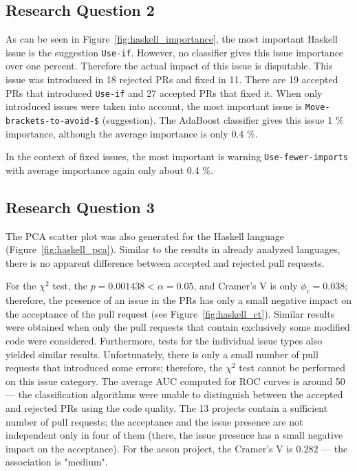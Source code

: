 \documentclass[digital,oneside,oldtable,nolof,nolot,nocover]{fithesis4}
\begin{document}
\subsection{Research Question 2}
\label{sec:org6159aab}
As can be seen in Figure~\ref{fig:haskell_importance},
the most important Haskell issue is the suggestion \texttt{Use-if}.
However, no classifier gives this
issue importance over one percent. Therefore the actual impact of this issue is disputable.
This issue was introduced in 18 rejected PRs and fixed in 11. There are 19 accepted PRs that
introduced \texttt{Use-if} and 27 accepted PRs that fixed it.
When only introduced issues were taken into account, the most important
issue is \texttt{Move-brackets-to-avoid-\$} (suggestion). The AdaBoost classifier
gives this issue 1 \% importance, although the average importance is only 0.4 \%.

In the context of fixed issues, the most important is warning
\texttt{Use-fewer-imports} with average importance again only about 0.4 \%.
\subsection{Research Question 3}
\label{sec:orgeb0969e}
The PCA scatter plot was also generated for the Haskell language (Figure~\ref{fig:haskell_pca}).
Similar to the results in already analyzed languages, there is no apparent
difference between accepted and rejected pull requests.

For the \(\chi^2\) test, the \(p = 0.001438 < \alpha = 0.05\), and Cramer's V is only \(\phi_c = 0.038\);
therefore, the presence of an issue in the PRs has only a small negative impact on the
acceptance of the pull request (see Figure~\ref{fig:haskell_ct}). Similar results were obtained when only
the pull requests that contain exclusively some modified code were considered.
Furthermore, tests for the individual issue types also yielded similar results.
Unfortunately, there is only a small number of pull requests that introduced some errors;
therefore, the \(\chi^2\) test cannot be performed on this issue category.
The average AUC computed for ROC curves is around 50 --- the classification algorithms
were unable to distinguish between the accepted and rejected PRs using the code quality.
The 13 projects contain a sufficient number of pull requests; the acceptance and
the issue presence are not independent only in four of them (there, the issue presence
has a small negative impact on the acceptance). For the aeson project,
the Cramer's V is \(0.282\) --- the association is "medium".
\end{document}
